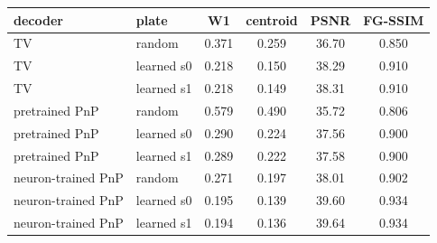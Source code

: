 \begin{tabular}{@{}llcccc@{}}\toprule
decoder & plate & W1 & centroid & PSNR & FG-SSIM\\\midrule
TV & random & 0.371 & 0.259 & 36.70 & 0.850\\
TV & learned s0 & 0.218 & 0.150 & 38.29 & 0.910\\
TV & learned s1 & 0.218 & 0.149 & 38.31 & 0.910\\
pretrained PnP & random & 0.579 & 0.490 & 35.72 & 0.806\\
pretrained PnP & learned s0 & 0.290 & 0.224 & 37.56 & 0.900\\
pretrained PnP & learned s1 & 0.289 & 0.222 & 37.58 & 0.900\\
neuron-trained PnP & random & 0.271 & 0.197 & 38.01 & 0.902\\
neuron-trained PnP & learned s0 & 0.195 & 0.139 & 39.60 & 0.934\\
neuron-trained PnP & learned s1 & 0.194 & 0.136 & 39.64 & 0.934\\
\bottomrule\end{tabular}
